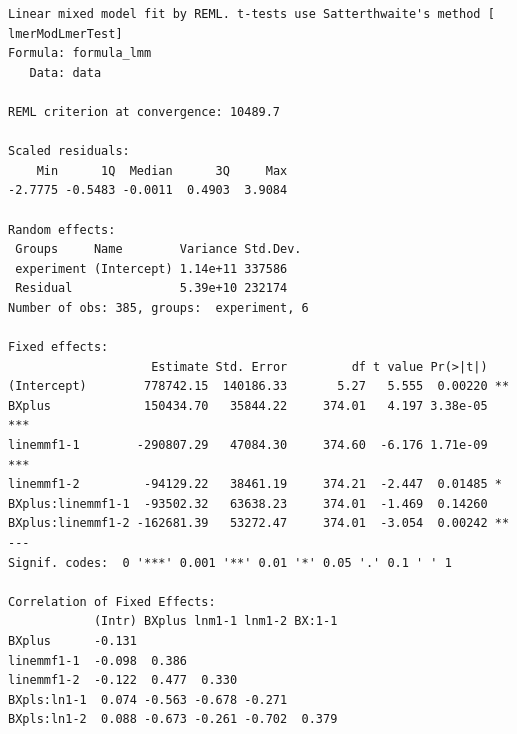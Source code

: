 \documentclass[
  10pt,
]{article}
\begin{document}
\begin{verbatim}
Linear mixed model fit by REML. t-tests use Satterthwaite's method [
lmerModLmerTest]
Formula: formula_lmm
   Data: data

REML criterion at convergence: 10489.7

Scaled residuals: 
    Min      1Q  Median      3Q     Max 
-2.7775 -0.5483 -0.0011  0.4903  3.9084 

Random effects:
 Groups     Name        Variance Std.Dev.
 experiment (Intercept) 1.14e+11 337586  
 Residual               5.39e+10 232174  
Number of obs: 385, groups:  experiment, 6

Fixed effects:
                    Estimate Std. Error         df t value Pr(>|t|)    
(Intercept)        778742.15  140186.33       5.27   5.555  0.00220 ** 
BXplus             150434.70   35844.22     374.01   4.197 3.38e-05 ***
linemmf1-1        -290807.29   47084.30     374.60  -6.176 1.71e-09 ***
linemmf1-2         -94129.22   38461.19     374.21  -2.447  0.01485 *  
BXplus:linemmf1-1  -93502.32   63638.23     374.01  -1.469  0.14260    
BXplus:linemmf1-2 -162681.39   53272.47     374.01  -3.054  0.00242 ** 
---
Signif. codes:  0 '***' 0.001 '**' 0.01 '*' 0.05 '.' 0.1 ' ' 1

Correlation of Fixed Effects:
            (Intr) BXplus lnm1-1 lnm1-2 BX:1-1
BXplus      -0.131                            
linemmf1-1  -0.098  0.386                     
linemmf1-2  -0.122  0.477  0.330              
BXpls:ln1-1  0.074 -0.563 -0.678 -0.271       
BXpls:ln1-2  0.088 -0.673 -0.261 -0.702  0.379
\end{verbatim}
\end{document}
